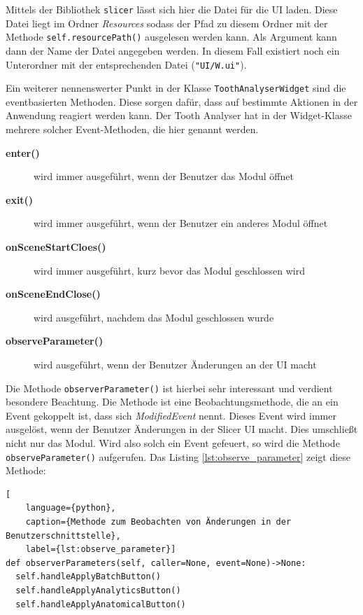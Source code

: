 Mittels der Bibliothek \texttt{slicer} lässt sich hier die Datei für die \ac{UI}
laden. Diese Datei liegt im Ordner \textit{Resources} sodass der Pfad zu diesem Ordner
mit der Methode \texttt{self.resourcePath()} ausgelesen werden kann. Als Argument
kann dann der Name der Datei angegeben werden. In diesem Fall existiert noch ein
Unterordner mit der entsprechenden Datei (\texttt{"UI/W.ui"}).

Ein weiterer nennenswerter Punkt in der Klasse \texttt{ToothAnalyserWidget} sind
die eventbasierten Methoden. Diese sorgen dafür, dass auf bestimmte Aktionen in
der Anwendung reagiert werden kann. Der Tooth Analyser hat in der Widget-Klasse mehrere
solcher Event-Methoden, die hier genannt werden.

\begin{description}
	\item[\textbf{enter()}] wird immer ausgeführt, wenn der Benutzer das Modul
		öffnet

	\item[\textbf{exit()}] wird immer ausgeführt, wenn der Benutzer ein anderes
		Modul öffnet

	\item[\textbf{onSceneStartCloes()}] wird immer ausgeführt, kurz bevor das
		Modul geschlossen wird

	\item[\textbf{onSceneEndClose()}] wird ausgeführt, nachdem das Modul
		geschlossen wurde

	\item[\textbf{observeParameter()}] wird ausgeführt, wenn der Benutzer
		Änderungen an der \ac{UI} macht
\end{description}

Die Methode \texttt{observerParameter()} ist hierbei sehr interessant und
verdient besondere Beachtung. Die Methode ist eine Beobachtungsmethode, die an
ein Event gekoppelt ist, dass sich \textit{ModifiedEvent} nennt. Dieses Event wird
immer ausgelöst, wenn der Benutzer Änderungen in der Slicer \ac{UI} macht. Dies
umschließt nicht nur das Modul. Wird also solch ein Event gefeuert, so wird die
Methode \texttt{observeParameter()} aufgerufen. Das Listing
\ref{lst:observe_parameter} zeigt diese Methode:

\begin{lstlisting}[
    language={python},
    caption={Methode zum Beobachten von Änderungen in der Benutzerschnittstelle},
    label={lst:observe_parameter}]
def observerParameters(self, caller=None, event=None)->None:
  self.handleApplyBatchButton()
  self.handleApplyAnalyticsButton()
  self.handleApplyAnatomicalButton()
\end{lstlisting}


